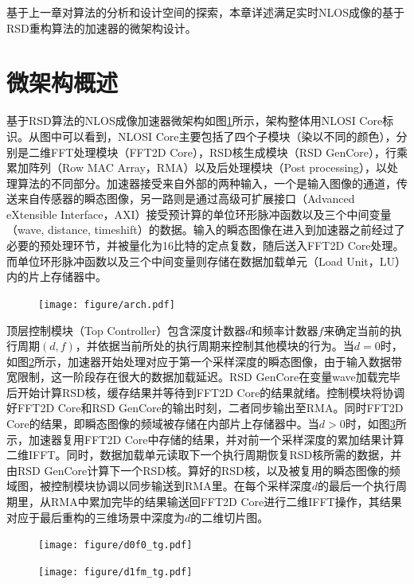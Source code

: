 \documentclass[master]{shtthesis}             %
\begin{document}
基于上一章对算法的分析和设计空间的探索，本章详述满足实时NLOS成像的基于RSD重构算法的加速器的微架构设计。

\section{微架构概述} \label{sec:setup_info}

基于RSD算法的NLOS成像加速器微架构如图\ref{fig:arch}所示，架构整体用NLOSI Core标识。从图中可以看到，NLOSI Core主要包括了四个子模块（染以不同的颜色），分别是二维FFT处理模块（FFT2D Core），RSD核生成模块（RSD GenCore），行乘累加阵列（Row MAC Array，RMA）以及后处理模块（Post processing），以处理算法的不同部分。加速器接受来自外部的两种输入，一个是输入图像的通道，传送来自传感器的瞬态图像，另一路则是通过高级可扩展接口（Advanced eXtensible Interface，AXI）接受预计算的单位环形脉冲函数以及三个中间变量（wave, distance, timeshift）的数据。输入的瞬态图像在进入到加速器之前经过了必要的预处理环节，并被量化为16比特的定点复数，随后送入FFT2D Core处理。而单位环形脉冲函数以及三个中间变量则存储在数据加载单元（Load Unit，LU）内的片上存储器中。
\begin{figure}[!htb]
    \centering
    \texttt{[image: figure/arch.pdf]}
    \label{fig:arch}
\end{figure}

顶层控制模块（Top Controller）包含深度计数器$d$和频率计数器$f$来确定当前的执行周期$(d,f)$，并依据当前所处的执行周期来控制其他模块的行为。当$d=0$时，如图\ref{fig:tg_d0}所示，加速器开始处理对应于第一个采样深度的瞬态图像，由于输入数据带宽限制，这一阶段存在很大的数据加载延迟。RSD GenCore在变量wave加载完毕后开始计算RSD核，缓存结果并等待到FFT2D Core的结果就绪。控制模块将协调好FFT2D Core和RSD GenCore的输出时刻，二者同步输出至RMA。同时FFT2D Core的结果，即瞬态图像的频域被存储在内部片上存储器中。当$d>0$时，如图\ref{fig:tg_d1}所示，加速器复用FFT2D Core中存储的结果，并对前一个采样深度的累加结果计算二维IFFT。同时，数据加载单元读取下一个执行周期恢复RSD核所需的数据，并由RSD GenCore计算下一个RSD核。算好的RSD核，以及被复用的瞬态图像的频域图，被控制模块协调以同步输送到RMA里。在每个采样深度$d$的最后一个执行周期里，从RMA中累加完毕的结果输送回FFT2D Core进行二维IFFT操作，其结果对应于最后重构的三维场景中深度为$d$的二维切片图。
\begin{figure}[!tb]
    \centering
    \texttt{[image: figure/d0f0\_tg.pdf]}
    \label{fig:tg_d0}
\end{figure}
\begin{figure}[!tb]
    \centering
    \texttt{[image: figure/d1fm\_tg.pdf]}
    \label{fig:tg_d1}
\end{figure}
\end{document}
